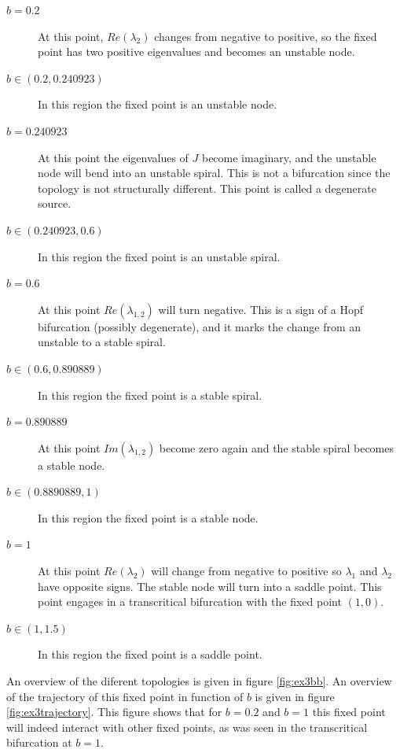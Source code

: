 \begin{description}
\item[$b = 0.2$]\hfill\newline At this point, $Re(\lambda_2)$ changes from negative to positive, so the fixed point has two positive eigenvalues and becomes an unstable node.
\item[$b \in (0.2,0.240923)$]\hfill\newline In this region the fixed point is an unstable node.
\item[$b = 0.240923$]\hfill\newline At this point the eigenvalues of $J$ become imaginary, and the unstable node will bend into an unstable spiral. This is not a bifurcation since the topology is not structurally different. This point is called a degenerate source.
\item[$b \in (0.240923,0.6)$]\hfill\newline In this region the fixed point is an unstable spiral.
\item[$b= 0.6$]\hfill\newline At this point $Re(\lambda_{1,2})$ will turn negative. This is a sign of a Hopf bifurcation (possibly degenerate), and it marks the change from an unstable to a stable spiral.
\item[$b \in (0.6, 0.890889)$]\hfill\newline In this region the fixed point is a stable spiral.
\item[$b = 0.890889$]\hfill\newline At this point $Im(\lambda_{1,2})$ become zero again and the stable spiral becomes a stable node.
\item[$b \in (0.8890889,1)$]\hfill\newline In this region the fixed point is a stable node.
\item[$b=1$]\hfill\newline At this point $Re(\lambda_2)$ will change from negative to positive so $\lambda_1$ and $\lambda_2$ have opposite signs. The stable node will turn into a saddle point. This point engages in a transcritical bifurcation with the fixed point $(1,0)$.
\item[$b\in(1,1.5)$]\hfill\newline In this region the fixed point is a saddle point. 
\end{description}
An overview of the diferent topologies is given in figure \ref{fig:ex3bb}. An overview of the trajectory of this fixed point in function of $b$ is given in figure \ref{fig:ex3trajectory}. This figure shows that for $b=0.2$ and $b=1$ this fixed point will indeed interact with other fixed points, as was seen in the transcritical bifurcation at $b=1$.
